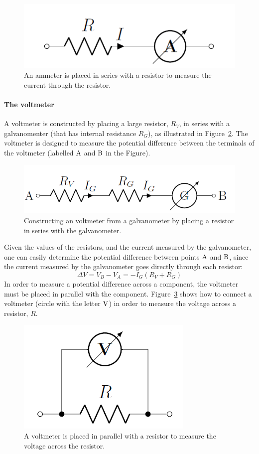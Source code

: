 \begin{figure}[!htbp]
\centering
\includegraphics[width=0.4\linewidth]{files/ammeterR-6b1f56c0a866644a94700534fcf4da05.png}
\caption[]{An ammeter is placed in series with a resistor to measure the current through the resistor.}
\label{fig:circuits:ammeterR}
\end{figure}

\paragraph{The voltmeter}

A voltmeter is constructed by placing a large resistor, $R_V$, in series with a galvanomenter (that has internal resistance $R_G$), as illustrated in Figure~\ref{fig:circuits:voltmeter}. The voltmeter is designed to measure the potential difference between the terminals of the voltmeter (labelled ${\rm A}$ and ${\rm B}$ in the Figure).

\begin{figure}[!htbp]
\centering
\includegraphics[width=0.5\linewidth]{files/voltmeter-49ef0913942c401600576df4ae715547.png}
\caption[]{Constructing an voltmeter from a galvanometer by placing a resistor in series with the galvanometer.}
\label{fig:circuits:voltmeter}
\end{figure}

Given the values of the resistors, and the current measured by the galvanometer, one can easily determine the potential difference between points ${\rm A}$ and ${\rm B}$, since the current measured by the galvanometer goes directly through each resistor:
\begin{equation}
\Delta V = V_B-V_A=-I_G(R_V+R_G)
\end{equation}
In order to measure a potential difference across a component, the voltmeter must be placed in parallel with the component. Figure~\ref{fig:circuits:voltmeterR} shows how to connect a voltmeter (circle with the letter ${\rm V}$) in order to measure the voltage across a resistor, $R$.

\begin{figure}[!htbp]
\centering
\includegraphics[width=0.3\linewidth]{files/voltmeterR-64b16d12078075d9e8cbf6f8dd3935e8.png}
\caption[]{A voltmeter is placed in parallel with a resistor to measure the voltage across the resistor.}
\label{fig:circuits:voltmeterR}
\end{figure}

